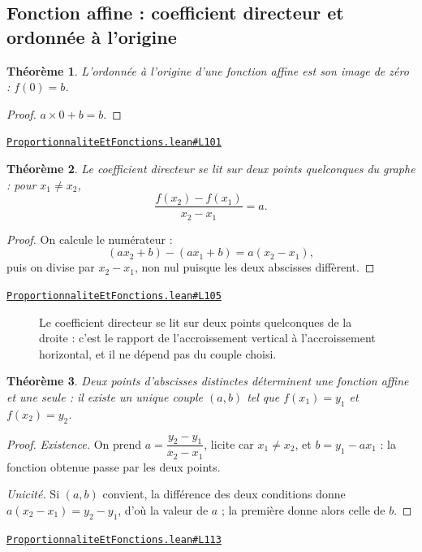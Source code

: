 \documentclass[11pt,a4paper]{article}
\theoremstyle{definition}
\theoremstyle{plain}
\newtheorem{theoreme}{Théorème}
\newcommand{\source}[2]{\par\smallskip\noindent\hfill{\footnotesize\href{#1}{\texttt{#2}}}\par\smallskip}
\begin{document}
\subsection{Fonction affine : coefficient directeur et ordonnée à l'origine}

\begin{theoreme}
L'ordonnée à l'origine d'une fonction affine est son image de zéro : $f(0) = b$.
\end{theoreme}

\begin{proof}
$a \times 0 + b = b$.
\end{proof}
\source{https://github.com/Commutator-IO/learn-lean/blob/main/courses/01-college/05-proportionnalite-et-fonctions/ProportionnaliteEtFonctions.lean\#L101}{ProportionnaliteEtFonctions.lean\#L101}

\begin{theoreme}
Le coefficient directeur se lit sur deux points quelconques du graphe : pour
$x_1 \ne x_2$,
\[ \frac{f(x_2) - f(x_1)}{x_2 - x_1} = a . \]
\end{theoreme}

\begin{proof}
On calcule le numérateur :
\[ (ax_2 + b) - (ax_1 + b) = a(x_2 - x_1) , \]
puis on divise par $x_2 - x_1$, non nul puisque les deux abscisses diffèrent.
\end{proof}
\source{https://github.com/Commutator-IO/learn-lean/blob/main/courses/01-college/05-proportionnalite-et-fonctions/ProportionnaliteEtFonctions.lean\#L105}{ProportionnaliteEtFonctions.lean\#L105}

\begin{figure}[h]
\centering

\caption{Le coefficient directeur se lit sur deux points quelconques de la droite : c'est le rapport de l'accroissement vertical à l'accroissement horizontal, et il ne dépend pas du couple choisi.}
\end{figure}

\begin{theoreme}
Deux points d'abscisses distinctes déterminent une fonction affine et une seule : il
existe un unique couple $(a, b)$ tel que $f(x_1) = y_1$ et $f(x_2) = y_2$.
\end{theoreme}

\begin{proof}
\emph{Existence.} On prend $a = \dfrac{y_2 - y_1}{x_2 - x_1}$, licite car
$x_1 \ne x_2$, et $b = y_1 - a x_1$ : la fonction obtenue passe par les deux points.

\emph{Unicité.} Si $(a, b)$ convient, la différence des deux conditions donne
$a(x_2 - x_1) = y_2 - y_1$, d'où la valeur de $a$ ; la première donne alors celle de
$b$.
\end{proof}
\source{https://github.com/Commutator-IO/learn-lean/blob/main/courses/01-college/05-proportionnalite-et-fonctions/ProportionnaliteEtFonctions.lean\#L113}{ProportionnaliteEtFonctions.lean\#L113}
\end{document}
